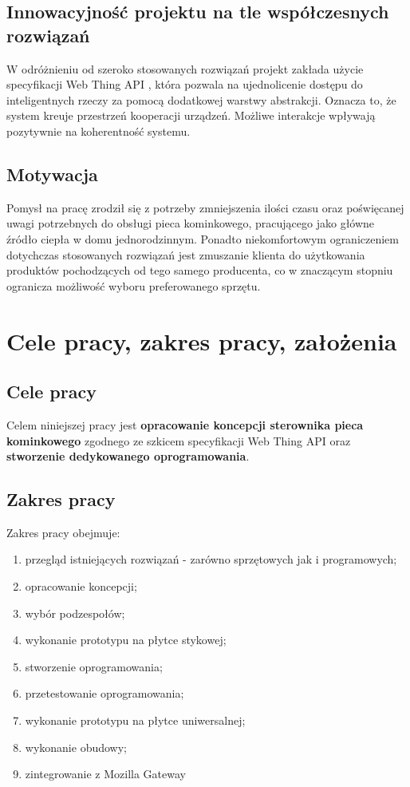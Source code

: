 \documentclass[11pt]{report}
\begin{document}
 \section{Innowacyjność projektu na tle współczesnych rozwiązań}
 W odróżnieniu od szeroko stosowanych rozwiązań projekt zakłada użycie specyfikacji Web Thing API \cite{WebThing2020}, która pozwala na ujednolicenie dostępu do inteligentnych rzeczy za pomocą dodatkowej warstwy abstrakcji. Oznacza to, że system kreuje przestrzeń kooperacji urządzeń. Możliwe interakcje wpływają pozytywnie na koherentność systemu.
 
 \section{Motywacja}
Pomysł na pracę zrodził się z potrzeby zmniejszenia ilości czasu oraz poświęcanej uwagi potrzebnych do obsługi pieca kominkowego, pracującego jako główne źródło ciepła w domu jednorodzinnym. Ponadto niekomfortowym ograniczeniem dotychczas stosowanych rozwiązań jest zmuszanie klienta do użytkowania produktów pochodzących od tego samego producenta, co w znaczącym stopniu ogranicza możliwość wyboru preferowanego sprzętu.


 \chapter{Cele pracy, zakres pracy, założenia}\label{ch:cele}

 \section{Cele pracy}
 Celem niniejszej pracy jest \textbf{opracowanie koncepcji sterownika pieca kominkowego} zgodnego ze szkicem specyfikacji Web Thing API oraz \textbf{stworzenie dedykowanego oprogramowania}.

 \section{Zakres pracy}
 Zakres pracy obejmuje:
 \begin{enumerate}
 \item przegląd istniejących rozwiązań - zarówno sprzętowych jak i programowych;
 \item opracowanie koncepcji;
 \item wybór podzespołów;
 \item wykonanie prototypu na płytce stykowej;
 \item stworzenie oprogramowania;
 \item przetestowanie oprogramowania; 
 \item wykonanie prototypu na płytce uniwersalnej;
 \item wykonanie obudowy;
 \item zintegrowanie z Mozilla Gateway
 \end{enumerate}
 
\end{document}
